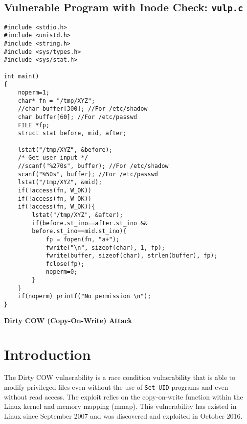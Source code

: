\documentclass[a4paper,12pt]{article}
\begin{document}
\subsection{Vulnerable Program with Inode Check: \texttt{vulp.c}}
\label{Appsec:3.3}
\begin{verbatim}
#include <stdio.h>
#include <unistd.h>
#include <string.h>
#include <sys/types.h>
#include <sys/stat.h>

int main()
{
    noperm=1;
    char* fn = "/tmp/XYZ";
    //char buffer[300]; //For /etc/shadow
    char buffer[60]; //For /etc/passwd
    FILE *fp;
    struct stat before, mid, after;

    lstat("/tmp/XYZ", &before);
    /* Get user input */
    //scanf("%270s", buffer); //For /etc/shadow
    scanf("%50s", buffer); //For /etc/passwd
    lstat("/tmp/XYZ", &mid);
    if(!access(fn, W_OK))
    if(!access(fn, W_OK))
    if(!access(fn, W_OK)){
        lstat("/tmp/XYZ", &after);
        if(before.st_ino==after.st_ino && 
        before.st_ino==mid.st_ino){
            fp = fopen(fn, "a+");
            fwrite("\n", sizeof(char), 1, fp);
            fwrite(buffer, sizeof(char), strlen(buffer), fp);
            fclose(fp);
            noperm=0;
        }
    }
    if(noperm) printf("No permission \n");
}
\end{verbatim}

\newpage
\begin{titlepage}
\begin{center}
	\vspace*{25em}
	\Huge
	\textbf{Dirty COW (Copy-On-Write) Attack}\\		
	\vfill
\end{center}
\end{titlepage}

\newpage
{}
\setcounter{section}{0}
\section{Introduction}
The Dirty COW vulnerability is a race condition vulnerability that is able to modify privileged files even without the use of \texttt{Set-UID} programs and even without read access. The exploit relies on the copy-on-write function within the Linux kernel and memory mapping (mmap). This vulnerability has existed in Linux since September 2007 and was discovered and exploited in October 2016.
\end{document}
